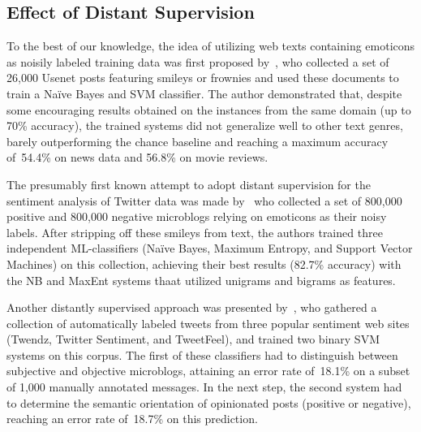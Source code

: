\subsection{Effect of Distant Supervision}
\todo[inline]{}

To the best of our knowledge, the idea of utilizing web texts
containing emoticons as noisily labeled training data was first
proposed by~\citet{Read:05}, who collected a set of 26,000 Usenet
posts featuring smileys or frownies and used these documents to train
a Na{\"i}ve Bayes and SVM classifier.  The author demonstrated that,
despite some encouraging results obtained on the instances from the
same domain (up to 70\% accuracy), the trained systems did not
generalize well to other text genres, barely outperforming the chance
baseline and reaching a maximum accuracy of~54.4\% on news data and
56.8\% on movie reviews.

The presumably first known attempt to adopt distant supervision for
the sentiment analysis of Twitter data was made by~\citet{Go:09} who
collected a set of 800,000 positive and 800,000 negative microblogs
relying on emoticons as their noisy labels.  After stripping off these
smileys from text, the authors trained three independent
ML-classifiers (Na{\"i}ve Bayes, Maximum Entropy, and Support Vector
Machines) on this collection, achieving their best results (82.7\%
accuracy) with the NB and MaxEnt systems thaat utilized unigrams and
bigrams as features.

Another distantly supervised approach was presented
by~\citet{Barbosa:10}, who gathered a collection of automatically
labeled tweets from three popular sentiment web sites (Twendz, Twitter
Sentiment, and TweetFeel), and trained two binary SVM systems on this
corpus.  The first of these classifiers had to distinguish between
subjective and objective microblogs, attaining an error rate of~18.1\%
on a subset of 1,000 manually annotated messages.  In the next step,
the second system had to determine the semantic orientation of
opinionated posts (positive or negative), reaching an error rate
of~18.7\% on this prediction.


